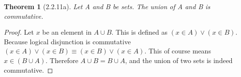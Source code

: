 \documentclass[a4paper, 12pt]{article}
\theoremstyle{plain}
\newtheorem*{theorem*}{Theorem}
\begin{document}
	
	\begin{theorem*}[2.2.11a]
		Let A and B be sets. The union of A and B is commutative.
	\end{theorem*}
	
	\begin{proof}
		Let $x$ be an element in $A \cup B$. This is defined as $(x \in A) \lor (x \in B)$. Because logical disjunction is commutative \newline $(x \in A) \lor (x \in B) \equiv (x \in B) \lor (x \in A)$. This of course means $x \in (B \cup A)$. Therefore $A \cup B = B \cup A$, and the union of two sets is indeed commutative.
	\end{proof}
\end{document}

